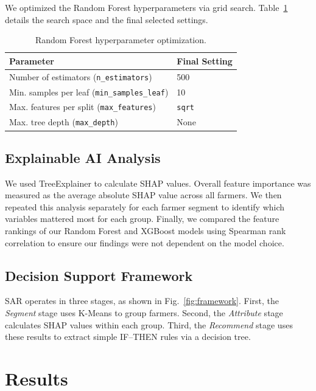 \documentclass[fleqn,10pt,lineno]{wlpeerj}
\begin{document}
We optimized the Random Forest hyperparameters via grid search. Table~\ref{tab:hyperparameters} details the search space and the final selected settings.

\begin{table}[htbp]
\centering
\caption{Random Forest hyperparameter optimization.}
\label{tab:hyperparameters}
\begin{tabular}{@{}ll@{}}
\toprule
\textbf{Parameter} & \textbf{Final Setting} \\
\midrule
Number of estimators (\texttt{n\_estimators}) & 500 \\
Min. samples per leaf (\texttt{min\_samples\_leaf}) & 10 \\
Max. features per split (\texttt{max\_features}) & \texttt{sqrt} \\
Max. tree depth (\texttt{max\_depth}) & None \\
\bottomrule
\end{tabular}
\end{table} 

\subsection{Explainable AI Analysis}
We used TreeExplainer \citep{lundberg2017} to calculate SHAP values. Overall feature importance was measured as the average absolute SHAP value across all farmers. We then repeated this analysis separately for each farmer segment to identify which variables mattered most for each group. Finally, we compared the feature rankings of our Random Forest and XGBoost models using Spearman rank correlation to ensure our findings were not dependent on the model choice.

\subsection{Decision Support Framework}

SAR operates in three stages, as shown in Fig.~\ref{fig:framework}. First, 
the \textit{Segment} stage uses K-Means to group farmers. Second, 
the \textit{Attribute} stage calculates SHAP values within each 
group. Third, the \textit{Recommend} stage uses these results to 
extract simple IF--THEN rules via a decision tree.

\section{Results}
\end{document}
